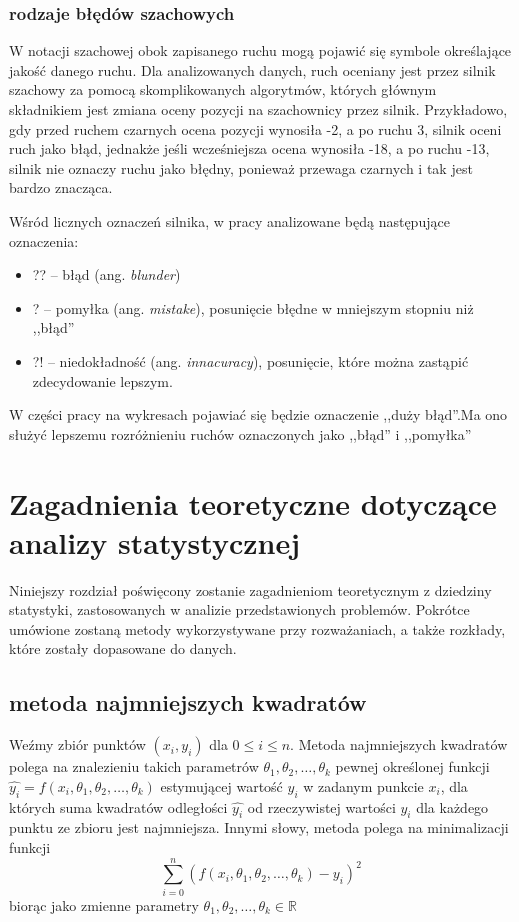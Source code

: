 \documentclass[inzynierska]{pwr_wmat_praca_dyplomowa}
\theoremstyle{plain}
\numberwithin{theorem}{chapter}
\theoremstyle{definition}
\numberwithin{theorem}{chapter}
\begin{document}
\subsection{rodzaje błędów szachowych} \label{sec:mysection}


W notacji szachowej obok zapisanego ruchu mogą pojawić się symbole określające jakość danego ruchu. Dla analizowanych danych, ruch oceniany jest przez silnik szachowy za pomocą skomplikowanych algorytmów, których głównym składnikiem jest zmiana oceny pozycji na szachownicy przez silnik.
Przykładowo, gdy przed ruchem czarnych ocena pozycji wynosiła -2, a po ruchu 3, silnik oceni ruch jako błąd, jednakże jeśli wcześniejsza ocena wynosiła -18, a po ruchu -13, silnik nie oznaczy ruchu jako błędny, ponieważ przewaga czarnych i tak jest bardzo znacząca.

Wśród licznych oznaczeń silnika, w pracy analizowane będą następujące oznaczenia\cite{symbols}:
\begin{itemize}
	\item ??\hphantom{!} -- błąd (ang. \textit{blunder})
	\item ?\hphantom{?!}  -- pomyłka (ang. \textit{mistake}), posunięcie błędne w mniejszym stopniu niż ,,błąd''
	\item ?!\hphantom{?} -- niedokładność  (ang. \textit{innacuracy}), posunięcie, które można zastąpić zdecydowanie lepszym.
\end{itemize}
W części pracy na wykresach pojawiać się będzie oznaczenie ,,duży błąd''.Ma ono służyć lepszemu rozróżnieniu ruchów oznaczonych jako ,,błąd'' i ,,pomyłka''



\chapter{Zagadnienia teoretyczne dotyczące analizy statystycznej}
Niniejszy rozdział poświęcony zostanie zagadnieniom teoretycznym z dziedziny statystyki, zastosowanych w analizie przedstawionych problemów. Pokrótce umówione zostaną metody wykorzystywane przy rozważaniach, a także rozkłady, które zostały dopasowane do danych.

\section{metoda najmniejszych kwadratów}
Weźmy zbiór punktów $(x_i, y_i)$ dla $0\leq i \leq n$.
Metoda najmniejszych kwadratów\cite{dekking2005modern} polega na znalezieniu takich parametrów $\theta_1, \theta_2, \dots, \theta_k$ pewnej określonej funkcji $\hat{y_i} = f\left(x_i, \theta_1, \theta_2, \dots, \theta_k \right)$ estymującej wartość $y_i$ w zadanym punkcie $x_i$, dla których suma kwadratów odległości $\hat{y_i}$ od rzeczywistej wartości $y_i$ dla każdego punktu ze zbioru jest najmniejsza. Innymi słowy, metoda polega na minimalizacji funkcji 
\begin{equation*}
	\sum_{i=0}^{n}(f\left(x_i, \theta_1, \theta_2, \dots, \theta_k \right)-y_i)^2
\end{equation*}
biorąc jako zmienne parametry $ \theta_1, \theta_2, \dots, \theta_k \in \mathbb{R} $
\end{document}
